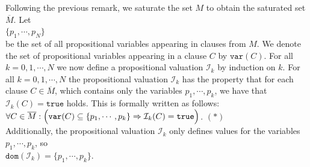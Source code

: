 Following the previous remark, we saturate the set $M$ to obtain the saturated set $\overline{M}$. Let
\\[0.2cm]
\hspace*{1.3cm}
$\{ p_1, \cdots, p_N \}$
\\[0.2cm]
be the set of all propositional variables appearing in clauses from $M$. We denote the set of propositional variables appearing in a clause $C$ by $\mathtt{var}(C)$.
For all $k=0,1,\cdots,N$
we now define a propositional valuation $\mathcal{I}_k$ by induction on $k$.  For all $k=0,1,\cdots,N$ the
propositional valuation $\mathcal{I}_k$ has the property that for each clause $C \in \overline{M}$,
which contains only the variables $p_1,\cdots,p_k$, we have that
$\mathcal{I}_k(C) = \mathtt{true}$ holds. This is formally written as follows:
\\[0.2cm]
\hspace*{1.3cm}
$\forall C \in \overline{M}:\Bigl(\mathtt{var}(C) \subseteq \{p_1, \cdots, p_k\} \Rightarrow \mathcal{I}_k(C) =
\mathtt{true}\Bigl)$. \hspace*{\fill} $(*)$
\\[0.2cm]
Additionally, the propositional valuation $\mathcal{I}_k$ only defines values for the variables
$p_1,\cdots,p_k$, so
\\[0.2cm]
\hspace*{1.3cm}
$\mathtt{dom}(\mathcal{I}_k) = \{p_1, \cdots, p_k\}$.
